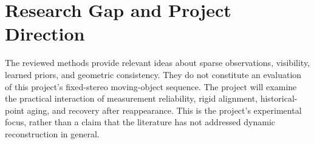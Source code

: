 \section{Research Gap and Project Direction}
The reviewed methods provide relevant ideas about sparse observations, visibility, learned priors, and geometric consistency. They do not constitute an evaluation of this project's fixed-stereo moving-object sequence. The project will examine the practical interaction of measurement reliability, rigid alignment, historical-point aging, and recovery after reappearance. This is the project's experimental focus, rather than a claim that the literature has not addressed dynamic reconstruction in general.

